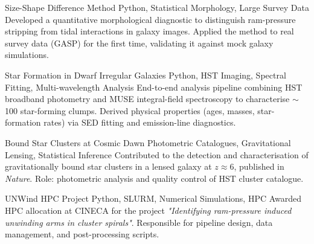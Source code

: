 
\begin{projects}

  \project
    {Size-Shape Difference Method}
    {Python, Statistical Morphology, Large Survey Data}
    {}
    {Developed a quantitative morphological diagnostic to distinguish ram-pressure
     stripping from tidal interactions in galaxy images.
     Applied the method to real survey data (GASP) for the first time,
     validating it against mock galaxy simulations.}

  \project
    {Star Formation in Dwarf Irregular Galaxies}
    {Python, HST Imaging, Spectral Fitting, Multi-wavelength Analysis}
    {}
    {End-to-end analysis pipeline combining HST broadband photometry and MUSE
     integral-field spectroscopy to characterise $\sim$100 star-forming clumps.
     Derived physical properties (ages, masses, star-formation rates) via SED fitting
     and emission-line diagnostics.}

  \project
    {Bound Star Clusters at Cosmic Dawn}
    {Photometric Catalogues, Gravitational Lensing, Statistical Inference}
    {}
    {Contributed to the detection and characterisation of gravitationally bound
     star clusters in a lensed galaxy at $z \approx 6$, published in \textit{Nature}.
     Role: photometric analysis and quality control of HST cluster catalogue.}

  \project
    {UNWind HPC Project}
    {Python, SLURM, Numerical Simulations, HPC}
    {}
    {Awarded HPC allocation at CINECA for the project
     \textit{"Identifying ram-pressure induced unwinding arms in cluster spirals"}.
     Responsible for pipeline design, data management, and post-processing scripts.}

\end{projects}
